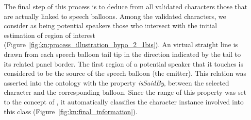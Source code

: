 The final step of this process is to deduce from all validated characters those that are actually linked to speech balloons.
Among the validated characters, we consider as being potential speakers those who intersect with the initial estimation of region of interest (Figure~\ref{fig:kn:process_illustration_hypo_2_1bis}).
An virtual straight line is drawn from each speech balloon tail tip in the direction indicated by the tail to its related panel border.
The first region of a potential speaker that it touches is considered to be the source of the speech balloon (the emitter).
This relation was asserted into the ontology with the property \textit{isSaidBy}, between the selected character and the corresponding balloon.
Since the range of this property was set to the concept of , it automatically classifies the character instance involved into this class (Figure~\ref{fig:kn:final_information}).



